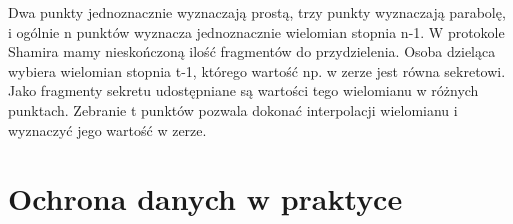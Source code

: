 \documentclass[answers,11pt]{exam}
\begin{document}
\begin{questions}
\begin{solution}
Dwa punkty jednoznacznie wyznaczają  prostą, trzy punkty wyznaczają
parabolę, i ogólnie n punktów wyznacza jednoznacznie wielomian stopnia
n-1. W protokole Shamira mamy nieskończoną ilość fragmentów do
przydzielenia. Osoba dzieląca wybiera wielomian stopnia t-1, którego
wartość np. w zerze jest równa sekretowi. Jako fragmenty sekretu
udostępniane są wartości tego wielomianu w różnych punktach. Zebranie
t punktów pozwala dokonać interpolacji wielomianu i wyznaczyć jego
wartość w zerze.
\end{solution}


\end{questions}

\section{Ochrona danych w praktyce}
\end{document}
